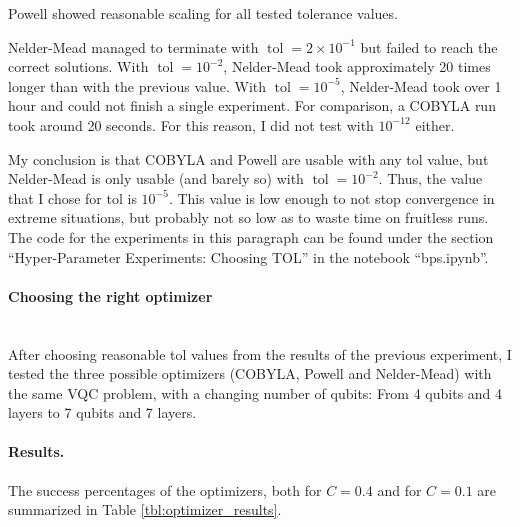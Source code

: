 \documentclass[a4paper,12pt]{article}
\newcommand{\e}[1]{ 10^{#1}}
\DeclareMathOperator{\tol}{tol}
\begin{document}
Powell showed reasonable scaling for all tested tolerance values.

Nelder-Mead managed to terminate with $\tol=2 \times \e{-1}$ but failed to reach the correct solutions.
With $\tol=\e{-2}$, Nelder-Mead took approximately 20 times longer than with the previous value.
With $\tol=\e{-5}$, Nelder-Mead took over 1 hour and could not finish a single experiment. For comparison, a COBYLA run took around 20 seconds.
For this reason, I did not test with $\e{-12}$ either.

My conclusion is that COBYLA and Powell are usable with any tol value, but Nelder-Mead is only usable (and barely so) with $\tol=\e{-2}$.
Thus, the value that I chose for tol is $\e{-5}$. This value is low enough to not stop convergence in extreme situations, but probably not so low as to waste time on fruitless runs.
The code for the experiments in this paragraph can be found under the section ``Hyper-Parameter Experiments: Choosing TOL'' in the notebook ``bps.ipynb''.

\paragraph*{Choosing the right optimizer}~\\
After choosing reasonable tol values from the results of the previous experiment, I tested the three possible optimizers (COBYLA, Powell and Nelder-Mead) with the same VQC problem, with a changing number of qubits:
From 4 qubits and 4 layers to 7 qubits and 7 layers.

\paragraph*{Results.}
The success percentages of the optimizers, both for $C=0.4$ and for $C=0.1$ are summarized in Table \ref{tbl:optimizer_results}.
\end{document}

